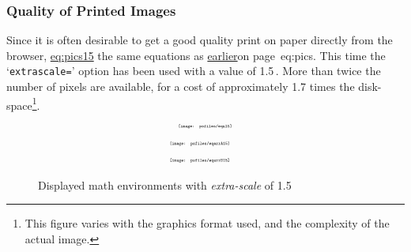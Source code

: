 \subsubsection{Quality of Printed Images\label{printqual}}
%
Since it is often desirable to get a good quality print on paper
directly from the browser, \hyperref{here are}{Figure~}{ shows}{eq:pics15} 
the same equations as \hyperref[page]{earlier}{on page~}{}{eq:pics}.
This time the `\texttt{extrascale=}' option has been used with a value of 1.5\,.
More than twice the number of pixels are available, 
for a cost of approximately 1.7 times the disk-space\footnote{This figure
varies with the graphics format used, and the complexity of the actual image.}.


\begin{figure}[hb]
\begin{equation}
 \hbox{\scalebox{.4}{\texttt{[image: psfiles/eqn15]}}}
\end{equation}%
\begin{eqnarray}
 \nonumber
 \hbox{\scalebox{.4}{\texttt{[image: psfiles/eqarrA15]}}}
 &&\\
 \hbox{\scalebox{.4}{\texttt{[image: psfiles/eqarrB15]}}}
 &&
\end{eqnarray}
\caption{Displayed math environments with \emph{extra-scale} of 1.5}
\label{eq:pics15}%
\end{figure}

